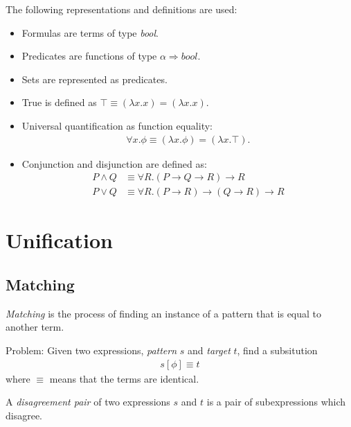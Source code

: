 \documentclass{article}
\begin{document}
\begin{definition}
    The following representations and definitions are used:
    \begin{itemize}
        \item Formulas are terms of type \textit{bool}.
        \item Predicates are functions of type $\alpha\Rightarrow\textit{bool}$.
        \item Sets are represented as predicates.
        \item True is defined as $\top \equiv (\lambda x.x)=(\lambda x.x)$.
        \item Universal quantification as function equality: \begin{align*}
            \forall x. \phi \equiv (\lambda x. \phi) = (\lambda x. \top).
        \end{align*}
        \item Conjunction and disjunction are defined as: \begin{align*}
            P\wedge Q &\equiv \forall R. (P\rightarrow Q \rightarrow R) \rightarrow R\\
            P\vee Q &\equiv \forall R. (P\rightarrow R)\rightarrow (Q\rightarrow R) \rightarrow R
        \end{align*}
    \end{itemize}
\end{definition}

\section{Unification}

\subsection{Matching}

\begin{definition}
    \emph{Matching} is the process of finding an instance of a pattern that is equal to another term.

    Problem: Given two expressions, \emph{pattern} $s$ and \emph{target} $t$, find a subsitution
    \begin{align*}
        s[\phi] \equiv t
    \end{align*}
    where $\equiv$ means that the terms are identical.
\end{definition}

\begin{definition}
    A \emph{disagreement pair} of two expressions $s$ and $t$ is a pair of subexpressions
    which disagree.
\end{definition}
\end{document}
